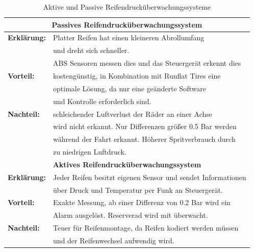                 \begin{table}
                    \begin{tabularx}{\textwidth} {l|l}
                        
                        
                        \multicolumn{2}{c}{\textbf{Passives Reifendrucküberwachungssystem}}\\
                        \hline
                        \textbf{Erklärung:} & Platter Reifen hat einen kleineren Abrollumfang \\ & und dreht sich schneller.\\ & ABS Sensoren messen dies und das Steuergerät erkennt dies\\
                        \hline
                        \textbf{Vorteil:} & kostengünstig, in Kombination mit Runflat Tires eine \\ & optimale Lösung, da nur eine geänderte Software \\ & und Kontrolle erforderlich sind.\\
                        \hline
                        \textbf{Nachteil:} & schleichender Luftverlust der Räder an einer Achse \\ &  wird nicht erkannt. Nur Differenzen größer 0.5 Bar werden \\ & während der Fahrt erkannt. Höherer Spritverbrauch durch \\ & zu niedrigen Luftdruck.\\
                        \multicolumn{2}{c}{\textbf{Aktives Reifendrucküberwachungssystem}}\\
                        \hline
                        \textbf{Erklärung:} & Jeder Reifen besitzt eigenen Sensor und sendet Informationen \\ & über Druck und Temperatur per Funk an Steuergerät.\\
                        \hline
                        \textbf{Vorteil:} & Exakte Messung, ab einer Differenz von 0.2 Bar wird ein \\ & Alarm ausgelöst. Reserverad wird mit überwacht.\\
                        \hline
                        \textbf{Nachteil:}  & Teuer für Reifenmontage, da Reifen kodiert werden müssen\\ & und der Reifenwechsel aufwendig wird.\\

                    \end{tabularx}
                    \caption{Aktive und Passive Reifendrucküberwachungssysteme \cite{TS_rdks}}
                    \label{fig:TS08}

                \end{table}

